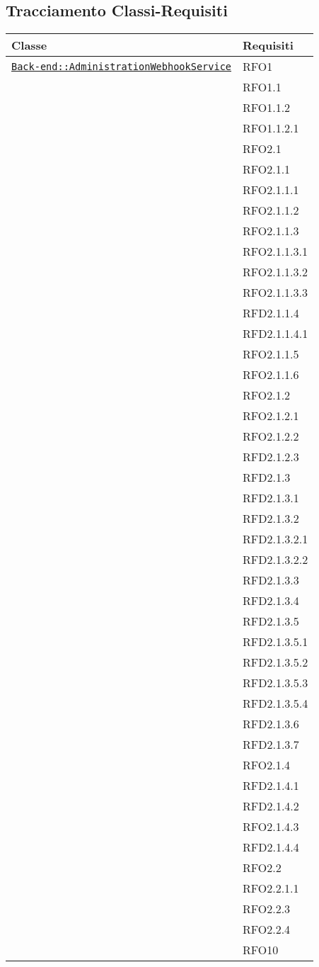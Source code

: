 \subsection{Tracciamento Classi-Requisiti}
\normalsize
\begin{longtable}{|>{\centering}m{10cm}|m{3cm}<{\centering}|}
\hline 
\textbf{Classe} & \textbf{Requisiti}\\
\hline
\endhead
\hyperref[Back-end::AdministrationWebhookService]{\texttt{Back-end::AdministrationWebhookService}} & RFO1\\
& RFO1.1\\
& RFO1.1.2\\
& RFO1.1.2.1\\
& RFO2.1\\
& RFO2.1.1\\
& RFO2.1.1.1\\
& RFO2.1.1.2\\
& RFO2.1.1.3\\
& RFO2.1.1.3.1\\
& RFO2.1.1.3.2\\
& RFO2.1.1.3.3\\
& RFD2.1.1.4\\
& RFD2.1.1.4.1\\
& RFO2.1.1.5\\
& RFO2.1.1.6\\
& RFO2.1.2\\
& RFO2.1.2.1\\
& RFO2.1.2.2\\
& RFD2.1.2.3\\
& RFD2.1.3\\
& RFD2.1.3.1\\
& RFD2.1.3.2\\
& RFD2.1.3.2.1\\
& RFD2.1.3.2.2\\
& RFD2.1.3.3\\
& RFD2.1.3.4\\
& RFD2.1.3.5\\
& RFD2.1.3.5.1\\
& RFD2.1.3.5.2\\
& RFD2.1.3.5.3\\
& RFD2.1.3.5.4\\
& RFD2.1.3.6\\
& RFD2.1.3.7\\
& RFO2.1.4\\
& RFD2.1.4.1\\
& RFD2.1.4.2\\
& RFO2.1.4.3\\
& RFD2.1.4.4\\
& RFO2.2\\
& RFO2.2.1.1\\
& RFO2.2.3\\
& RFO2.2.4\\
& RFO10\\ \hline


\end{longtable}
